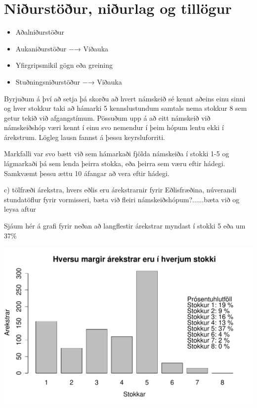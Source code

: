 \documentclass[a4paper,12pt]{article}
\begin{document}
\section{Niðurstöður, niðurlag og tillögur}
\begin{itemize}
\item Aðalniðurstöður
\item Aukaniðurstöður −→ Viðauka
\item Yfirgripsmikil gögn eða greining
\item Stuðningsniðurstöður −→ Viðauka
\end{itemize}

Byrjuðum á því að setja þá skorðu að hvert námskeið sé kennt aðeins einu sinni og hver stokkur taki að hámarki 5 kennslustundum samtals nema stokkur 8 sem getur tekið við afgangstímum. Pössuðum upp á að eitt námskeið við námskeiðshóp væri kennt í einu svo nemendur í þeim hópum lentu ekki í árekstrum. Lögleg lausn fannst á þessu keyrsluforriti.

Markfalli var svo bætt við sem hámarkaði fjölda námskeiða í stokki 1-5 og lágmarkaði þá sem lenda þeirra stokka, eða þeirra sem væru eftir hádegi. Samkvæmt þessu ættu 10 áfangar að vera eftir hádegi.

c) tölfræði árekstra, hvers eðlis eru árekstrarnir fyrir Eðlisfræðina, núverandi stundatöflur fyrir vormisseri, bæta við fleiri námskeiðshópum?......bæta við og leysa aftur


Sjáum hér á grafi fyrir neðan að langflestir árekstrar myndast í stokki 5 eða um 37$\%$
\begin{center}
\includegraphics[scale=0.5]{c_lidur_plot}
\end{center}
\end{document}
